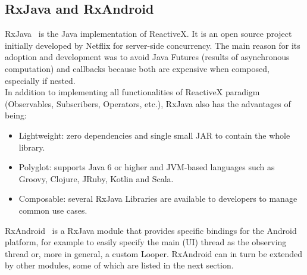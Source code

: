 \documentclass[11pt,a4paper,notitlepage]{article}
\begin{document}
\subsection{RxJava and RxAndroid}
RxJava~\cite{RxJava} is the Java implementation of ReactiveX. It is an open source project initially developed by Netflix for server-side concurrency. The main reason for its adoption and development was to avoid Java Futures (results of asynchronous computation) and callbacks because both are expensive when composed, especially if nested.\smallskip \\
In addition to implementing all functionalities of ReactiveX paradigm (Observables, Subscribers, Operators, etc.), RxJava also has the advantages of being:
\begin{itemize}
	\item Lightweight: zero dependencies and single small JAR to contain the whole library.
	\item Polyglot: supports Java 6 or higher and JVM-based languages such as Groovy, Clojure, JRuby, Kotlin and Scala.
	\item Composable: several RxJava Libraries are available to developers to manage common use cases.
\end{itemize} \bigskip
RxAndroid~\cite{RxAndroid} is a RxJava module that provides specific bindings for the Android platform, for example to easily specify the main (UI) thread as the observing thread or, more in general, a custom Looper. RxAndroid can in turn be extended by other modules, some of which are listed in the next section.
\end{document}
